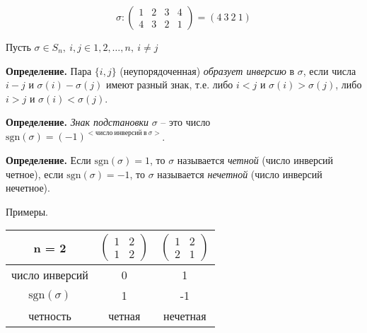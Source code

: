 \[ \sigma : \begin{pmatrix} 1 & 2 & 3 & 4 \\ 4 & 3 & 2 & 1 \end{pmatrix} = (4 \ 3 \ 2 \ 1) \]

\vspace{\baselineskip}
Пусть $\sigma \in S_n, \ i, j \in {1, 2, \dots, n}, \ i \neq j$

\vspace{\baselineskip}
\textbf{Определение.} Пара $\{i, j\}$ (неупорядоченная) \textit{образует инверсию} в $\sigma$, если числа $i-j$ и $\sigma (i) - \sigma (j)$ имеют разный знак, т.е. либо $i < j$ и $\sigma (i) > \sigma (j)$, либо $i > j$ и $\sigma (i) < \sigma (j)$.

\vspace{\baselineskip}
\textbf{Определение.} \textit{Знак подстановки} $\sigma$ -- это  число $\mathrm{sgn} (\sigma) = (-1) ^{<число \ инверсий \ в \ \sigma>}$.

\vspace{\baselineskip}
\textbf{Определение.} Если $\mathrm{sgn}(\sigma) = 1$, то $\sigma$ называется \textit{четной} (число инверсий четное), если $\mathrm{sgn}(\sigma) = -1$, то $\sigma$ называется \textit{нечетной} (число инверсий нечетное).

\vspace{\baselineskip}
Примеры.

\begin{table}[!ht]
		\begin{tabular}{c|c|c}
    	n = 2 & $\begin{pmatrix} 1 & 2 \\ 1 & 2 \end{pmatrix}$ & $\begin{pmatrix} 1 & 2 \\ 2 & 1 \end{pmatrix}$ \\
        \hline
       число инверсий & 0 & 1 \\
       \hline
          $\mathrm{sgn} (\sigma)$ & 1 & -1 \\
          \hline
        четность & четная & нечетная
		\end{tabular}
\end{table}

